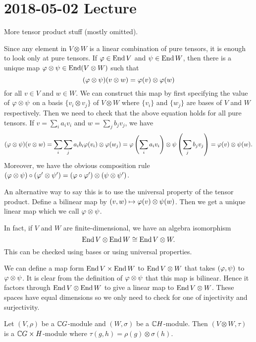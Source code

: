 \section{2018-05-02 Lecture}

More tensor product stuff (mostly omitted).

\begin{rmk}
  Since any element in $V \otimes W$ is a linear combination of pure tensors, it is enough to look only at pure tensors.
  If $\varphi \in \operatorname{End} V$ and $\psi \in \operatorname{End} W$, then there is a unique map $\varphi\otimes\psi \in \operatorname{End}(V \otimes W)$ such that
  \[(\varphi\otimes\psi)(v \otimes w) = \varphi(v) \otimes \varphi(w)\]
  for all $v \in V$ and $w \in W$.
  We can construct this map by first specifying the value of $\varphi\otimes\psi$ on a basis $\{v_i \otimes v_j\}$ of $V \otimes W$ where $\{v_i\}$ and $\{w_j\}$ are bases of $V$ and $W$ respectively.
  Then we need to check that the above equation holds for all pure tensors.
  If $v = \sum_i a_iv_i$ and $w = \sum_j b_jv_j$, we have
  \[(\varphi\otimes\psi)(v \otimes w) = \sum_i\sum_j a_ib_i \varphi(v_i)\otimes\varphi(w_j) = \varphi\left( \sum_i a_iv_i \right) \otimes \psi\left( \sum_j b_jv_j \right) = \varphi(v)\otimes\psi(w).\]
  Moreover, we have the obvious composition rule $(\varphi\otimes\psi)\circ(\varphi'\otimes\psi')=(\varphi\circ\varphi')\otimes(\psi\otimes\psi')$.

  An alternative way to say this is to use the universal property of the tensor product.
  Define a bilinear map by $(v,w) \mapsto \varphi(v)\otimes\psi(w)$.
  Then we get a unique linear map which we call $\varphi\otimes\psi$.

  In fact, if $V$ and $W$ are finite-dimensional, we have an algebra isomorphism
  \[\operatorname{End} V \otimes \operatorname{End} W \cong \operatorname{End} V \otimes W.\]
  This can be checked using bases or using universal properties.

  We can define a map form $\operatorname{End} V \times \operatorname{End} W$ to $\operatorname{End} V \otimes W$ that takes $(\varphi,\psi)$ to $\varphi\otimes\psi$.
  It is clear from the definition of $\varphi\otimes\psi$ that this map is bilinear.
  Hence it factors through $\operatorname{End} V \otimes \operatorname{End} W$ to give a linear map to $\operatorname{End} V \otimes W$.
  These spaces have equal dimensions so we only need to check for one of injectivity and surjectivity.
\end{rmk}

\begin{prop}
  Let $(V,\rho)$ be a $\mathbb{C} G$-module and $(W,\sigma)$ be a $\mathbb{C} H$-module.
  Then $(V \otimes W, \tau)$ is a $\mathbb{C} G \times H$-module where $\tau(g,h) = \rho(g)\otimes\sigma(h)$.
\end{prop}

